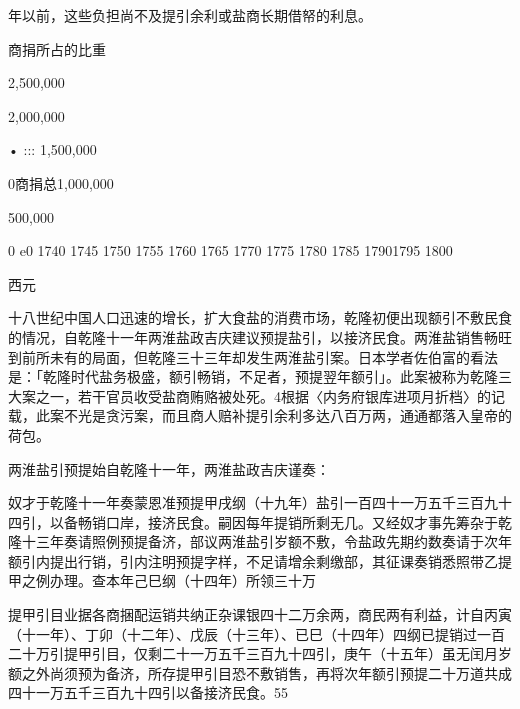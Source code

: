 \noindent 年以前，这些负担尚不及提引余利或盐商长期借帑的利息。

商捐所占的比重

2,500,000

2,000,000

• ::: 1,500,000

0商捐总1,000,000

500,000

\begin{BookQuote}
0 e0 1740 1745 1750 1755 1760 1765 1770 1775 1780 1785 17901795 1800
\end{BookQuote}

西元


十八世纪中国人口迅速的增长，扩大食盐的消费市场，乾隆初便出现额引不敷民食的情况，自乾隆十一年两淮盐政吉庆建议预提盐引，以接济民食。两淮盐销售畅旺到前所未有的局面，但乾隆三十三年却发生两淮盐引案。日本学者佐伯富的看法是：「乾隆时代盐务极盛，额引畅销，不足者，预提翌年额引」。此案被称为乾隆三大案之一，若干官员收受盐商贿赂被处死。4根据〈内务府银库进项月折档〉的记载，此案不光是贪污案，而且商人赔补提引余利多达八百万两，通通都落入皇帝的荷包。

两淮盐引预提始自乾隆十一年，两淮盐政吉庆谨奏：

\begin{BookQuote}
奴才于乾隆十一年奏蒙恩准预提甲戌纲（十九年）盐引一百四十一万五千三百九十四引，以备畅销口岸，接济民食。嗣因每年提销所剩无几。又经奴才事先筹杂于乾隆十三年奏请照例预提备济，部议两淮盐引岁额不敷，令盐政先期约数奏请于次年额引内提出行销，引内注明预提字样，不足请增余剩缴部，其征课奏销悉照带乙提甲之例办理。查本年己巳纲（十四年）所领三十万
\end{BookQuote}

\vfill
\begin{BookNotes}
\end{BookNotes}

\begin{BookQuote}
提甲引目业据各商捆配运销共纳正杂课银四十二万余两，商民两有利益，计自丙寅（十一年）、丁卯（十二年）、戊辰（十三年）、已巳（十四年）四纲已提销过一百二十万引提甲引目，仅剩二十一万五千三百九十四引，庚午（十五年）虽无闰月岁额之外尚须预为备济，所存提甲引目恐不敷销售，再将次年额引预提二十万道共成四十一万五千三百九十四引以备接济民食。55
\end{BookQuote}


